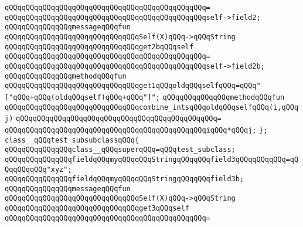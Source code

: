 \verb|qQQqqQQqqQQqqQQqqQQqqQQqqQQqqQQqqQQqqQQqqQQqqQQq=|\newline
\verb|qQQqqQQqqQQqqQQqqQQqqQQqqQQqqQQqqQQqqQQqqQQqqQQqself->field2;|\newline
\newline
\verb|qQQqqQQqqQQqqQQqmessageqQQqfun|\newline
\verb|qQQqqQQqqQQqqQQqqQQqqQQqqQQqqQQqSelf(X)qQQq->qQQqString|\newline
\verb|qQQqqQQqqQQqqQQqqQQqqQQqqQQqqQQqget2bqQQqself|\newline
\verb|qQQqqQQqqQQqqQQqqQQqqQQqqQQqqQQqqQQqqQQqqQQqqQQq=|\newline
\verb|qQQqqQQqqQQqqQQqqQQqqQQqqQQqqQQqqQQqqQQqqQQqqQQqself->field2b;|\newline
\newline
\verb|qQQqqQQqqQQqqQQqmethodqQQqfun|\newline
\verb|qQQqqQQqqQQqqQQqqQQqqQQqqQQqqQQqget1qQQqoldqQQqselfqQQq=qQQq"["qQQq+qQQq(oldqQQqself)qQQq+qQQq"]";|\newline
\newline
\verb|qQQqqQQqqQQqqQQqmethodqQQqfun|\newline
\verb|qQQqqQQqqQQqqQQqqQQqqQQqqQQqqQQqcombine_intsqQQqoldqQQqselfqQQq(i,qQQqj)|\newline
\verb|qQQqqQQqqQQqqQQqqQQqqQQqqQQqqQQqqQQqqQQqqQQqqQQq=|\newline
\verb|qQQqqQQqqQQqqQQqqQQqqQQqqQQqqQQqqQQqqQQqqQQqqQQqiqQQq*qQQqj;|\newline
\verb|};|\newline
\newline
\verb|class__qQQqtest_subsubclassqQQq{|\newline
\newline
\verb|qQQqqQQqqQQqqQQqclass__qQQqsuperqQQq=qQQqtest_subclass;|\newline
\newline
\verb|qQQqqQQqqQQqqQQqfieldqQQqmyqQQqqQQqStringqQQqqQQqfield3qQQqqQQqqQQq=qQQqqQQqqQQq"xyz";|\newline
\verb|qQQqqQQqqQQqqQQqfieldqQQqmyqQQqqQQqStringqQQqqQQqfield3b;|\newline
\newline
\verb|qQQqqQQqqQQqqQQqmessageqQQqfun|\newline
\verb|qQQqqQQqqQQqqQQqqQQqqQQqqQQqqQQqSelf(X)qQQq->qQQqString|\newline
\verb|qQQqqQQqqQQqqQQqqQQqqQQqqQQqqQQqget3qQQqself|\newline
\verb|qQQqqQQqqQQqqQQqqQQqqQQqqQQqqQQqqQQqqQQqqQQqqQQq=|\newline

